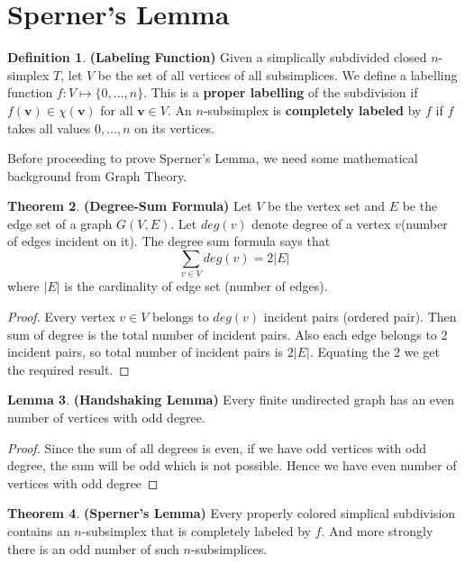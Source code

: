 \documentclass{article}
\theoremstyle{definition}
\newtheorem{theorem}{Theorem}[section]
\newtheorem{lem}[theorem]{Lemma}
\newtheorem{defn}[theorem]{Definition}
\begin{document}
\section{Sperner's Lemma}
\begin{defn}
\textbf{(Labeling Function)} Given a simplically subdivided closed $n$-simplex $T$, let $V$ be the set of all vertices of all subsimplices. We define a labelling function $f: V\mapsto \{0,\dots,n\}$. This is a \textbf{proper labelling}  of the subdivision if $f(\mathbf{v}) \in \chi(\mathbf{v})$ for all $\mathbf{v}\in V$. An $n$-subsimplex is \textbf{completely labeled} by $f$ if $f$ takes all values $0, \dots, n$ on its vertices.
\end{defn}
Before proceeding to prove Sperner's Lemma, we need some mathematical background from Graph Theory.
\begin{theorem}
\label{Degree Sum}
\textbf{(Degree-Sum Formula)} Let $V$ be the vertex set and $E$ be the edge set of a graph $G(V,E)$. Let $deg(v)$ denote degree of a vertex $v$(number of edges incident on it). The degree sum formula says that $$\sum_{v\in V} deg(v) = 2|E|$$ where $|E|$ is the cardinality of edge set (number of edges).
\end{theorem}
\begin{proof}
Every vertex $v\in V$ belongs to $deg(v)$ incident pairs (ordered pair). Then sum of degree is the total number of incident pairs. Also each edge belongs to 2 incident pairs, so total number of incident pairs is $2|E|$. Equating the 2 we get the required result.
\end{proof}
\begin{lem}
\label{Handshake}
\textbf{(Handshaking Lemma)} Every finite undirected graph has an even number of vertices with odd degree.
\end{lem}
\begin{proof}
Since the sum of all degrees is even, if we have odd vertices with odd degree, the sum will be odd which is not possible. Hence we have even number of vertices with odd degree
\end{proof}
\begin{theorem}
\label{Sperner}
\textbf{(Sperner's Lemma)} Every properly colored simplical subdivision contains an $n$-subsimplex that is completely labeled by $f$. And more strongly there is an odd number of such $n$-subsimplices.
\end{theorem}
\end{document}
